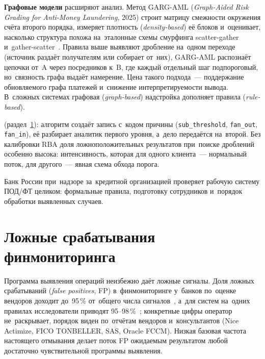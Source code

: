 \textbf{Графовые модели} расширяют анализ. Метод GARG-AML (\textit{Graph-Aided
Risk Grading for Anti-Money Laundering}, 2025) строит матрицу смежности
окружения счёта второго порядка, измеряет плотность (\textit{density-based})
её блоков и~оценивает, насколько структура похожа на~эталонные схемы
смурфинга scatter-gather и~gather-scatter~\cite{garg-aml-2025}. Правила
выше выявляют дробление на~одном переходе (источник раздаёт получателям или
собирает от~них), GARG-AML распознаёт цепочки от~A через
посредников к~B, где каждый отдельный шаг подпороговый, но~связность графа
выдаёт намерение. Цена такого подхода~--- поддержание обновляемого графа платежей
и~снижение интерпретируемости вывода. В~сложных системах графовая
(\textit{graph-based}) надстройка дополняет правила (\textit{rule-based}).

 (раздел~\ref{sec:aml-false-positives}):
алгоритм создаёт запись с~кодом причины (\texttt{sub\_threshold},
\texttt{fan\_out}, \texttt{fan\_in}), её разбирает аналитик первого уровня, а~дело
передаётся на~второй.
Без калибровки RBA доля ложноположительных результатов при~поиске дроблений
особенно высока: интенсивность, которая для одного клиента~--- нормальный
поток, для другого~--- явная схема обхода порога.

Банк России при~надзоре за~кредитной организацией проверяет рабочую систему
ПОД/ФТ целиком: формальные правила, подготовку сотрудников и~порядок обработки
выявленных случаев.

\section{Ложные срабатывания финмониторинга}\label{sec:aml-false-positives}

Программа выявления операций неизбежно даёт ложные сигналы. Доля ложных
срабатываний (\textit{false positives}, FP) в~финмониторинге у~банков
по~оценке вендоров доходит до~95\,\% от~общего числа
сигналов~\cite{nice-actimize-fp-2024}, а~для систем на~одних правилах
исследователи приводят 95--98\,\%~\cite{eddin-aml-alert-2022}; конкретные цифры оператор не~раскрывает, порядок виден по~отчётам
вендоров и~консультантов (Nice Actimize, FICO TONBELLER, SAS, Oracle FCCM).
Низкая базовая частота настоящего отмывания делает поток FP ожидаемым
результатом любой достаточно чувствительной программы выявления.

